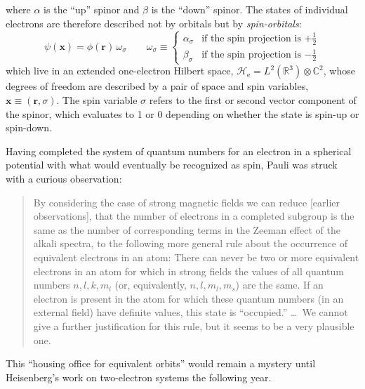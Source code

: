 where \(\alpha\) is the ``up'' spinor and \(\beta\) is the ``down'' spinor.
The states of individual electrons are therefore described not by orbitals but
by {\itshape spin-orbitals}:
\begin{equation}
    \psi(\mathbf{x})
    =
    \phi(\mathbf{r})\,
    \omega_\sigma
    \qquad
    \omega_\sigma
    \equiv
    \left\{
        \begin{array}{cl}
            \alpha_{\sigma}
            &
            \text{if the spin projection is \(+\tfrac{1}{2}\)}
            \\[10pt]
            \beta_{\sigma}
            &
            \text{if the spin projection is \(-\tfrac{1}{2}\)}
        \end{array}
    \right.
\end{equation}
which live in an extended one-electron Hilbert space,
\(
    \mathcal{H}_\mathrm{e}
    =
    L^2(\mathbb{R}^3)
    \otimes
    \mathbb{C}^2
\),
whose degrees of freedom are described by a pair of space and spin variables,
\(
    \mathbf{x}
    \equiv
    (\mathbf{r},\sigma)
\).
The spin variable \(\sigma\) refers to the first or second vector component of
the spinor, which evaluates to 1 or 0 depending on whether the state is spin-up
or spin-down.

Having completed the system of quantum numbers for an electron in a spherical
potential with what would eventually be recognized as spin, Pauli was struck
with a curious observation:
\begin{quote}
    By considering the case of strong magnetic fields we can reduce [earlier
    observations], that the number of electrons in a completed subgroup is the
    same as the number of corresponding terms in the Zeeman effect of the alkali
    spectra, to the following more general rule about the occurrence of
    equivalent electrons in an atom:
    There can never be two or more equivalent electrons in an atom for which
    in strong fields the values of all quantum numbers \(n, l, k, m_l\) (or,
    equivalently, \(n, l, m_l, m_s\)) are the same.
    If an electron is present in the atom for which these quantum numbers
    (in an external field) have definite values, this state is ``occupied.''
    \dots\
    We cannot give a further justification for this rule, but it seems to be a
    very plausible one.\cite{Pauli:1925p756}
\end{quote}
This ``housing office for equivalent orbits''\cite{Mehra:1982} would remain a
mystery until Heisenberg's work on two-electron systems the following year.


